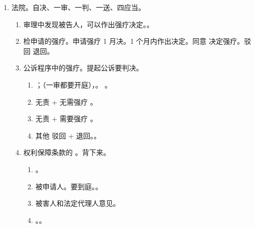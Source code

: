\begin{enumerate}
\begin{enumerate}
\begin{enumerate}
                  \item 不符合。向公安说明理由。
                  \item 公安没有启动强疗程序。先要求说理，后通知启动。同立案监督。
                \end{enumerate}
          \item 对依申请的强疗决定不服。不服 20 上法提意见。20 日内向上一级法院提检察意见。
                。
          \item 对公诉中法院的强疗判决不服。判决不服可上诉，检察监督提抗诉。
        \end{enumerate}
  \item 法院。自决、一审、一判、一送、四应当。
        \begin{enumerate}
          \item 审理中发现被告人，可以作出强疗决定。。
          \item 检申请的强疗。申请强疗 1 月决。1 个月内作出决定。\yi 同意 \yjt 决定强疗。\er 驳回 \yjt 退回。
          \item 公诉程序中的强疗。提起公诉要判决。
                \begin{enumerate}
                  \item {}；（一审都要开庭），。
                        。
                  \item 无责 + 无需强疗 \yjt {}。
                  \item 无责 + 需要强疗 \yjt {}。
                  \item 其他 \yjt 驳回 + 退回。。
                \end{enumerate}
          \item 权利保障条款的  \yjt {}。背下来。
                \begin{enumerate}
                  \item {}。
                  \item {}被申请人。\bdy 要到庭。。
                  \item {}被害人和法定代理人意见。
                  \item {}。。

\end{enumerate}
\end{enumerate}
\end{enumerate}
